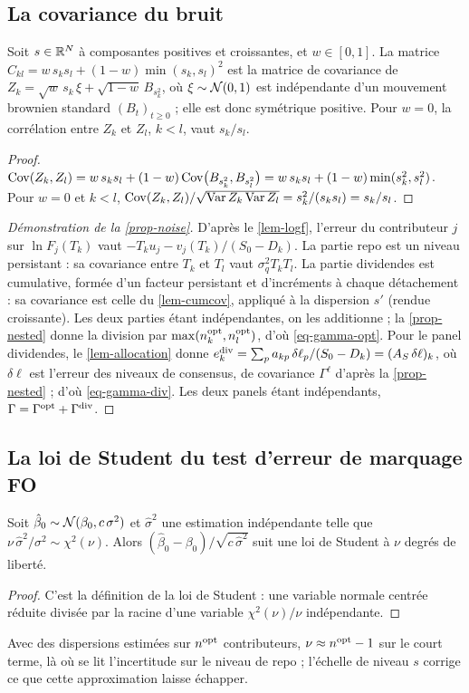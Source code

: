\subsection{La covariance du bruit}\label{app-noise}
\begin{lemma}\label{lem-cumcov}
Soit $s\in\mathbb{R}^N$ à composantes positives et croissantes, et $w\in[0,1]$. La matrice
$C_{kl}=w\,s_ks_l+(1-w)\min(s_k, s_l)^2$ est la matrice de covariance de $Z_k=\sqrt{w}\,s_k\,\xi+\sqrt{1-w}\,B_{s_k^2}$,
où $\xi\sim\mathcal{N}(0,1)$ est indépendante d'un mouvement brownien standard $(B_t)_{t\ge0}$ ; elle est donc symétrique
positive. Pour $w=0$, la corrélation entre $Z_k$ et $Z_l$, $k<l$, vaut $s_k/s_l$.
\end{lemma}
\begin{proof}
$\operatorname{Cov}(Z_k, Z_l)=w\,s_ks_l+(1-w)\operatorname{Cov}\bigl(B_{s_k^2}, B_{s_l^2}\bigr)=w\,s_ks_l+(1-w)\min(s_k^2, s_l^2)$. Pour $w=0$ et $k<l$,
$\operatorname{Cov}(Z_k, Z_l)/\sqrt{\operatorname{Var} Z_k\operatorname{Var} Z_l}=s_k^2/(s_ks_l)=s_k/s_l$.
\end{proof}

\begin{proof}[Démonstration de la \cref{prop-noise}]
D'après le \cref{lem-logf}, l'erreur du contributeur $j$ sur $\ln F_j(T_k)$ vaut $-T_ku_j-v_j(T_k)/(S_0-D_k)$. La partie
repo est un niveau persistant : sa covariance entre $T_k$ et $T_l$ vaut $\sigma_q^2T_kT_l$. La partie dividendes est
cumulative, formée d'un facteur persistant et d'incréments à chaque détachement : sa covariance est celle du
\cref{lem-cumcov}, appliqué à la dispersion $s'$ (rendue croissante). Les deux parties étant indépendantes, on les
additionne ; la \cref{prop-nested} donne la division par $\max(n^{\mathrm{opt}}_k, n^{\mathrm{opt}}_l)$, d'où \eqref{eq-gamma-opt}.
Pour le panel dividendes, le \cref{lem-allocation} donne
$e^{\mathrm{div}}_k=\sum_pa_{kp}\,\delta\ell_p/(S_0-D_k)=(A_S\,\delta\ell)_k$, où $\delta\ell$ est l'erreur des niveaux de
consensus, de covariance $\Gamma^\ell$ d'après la \cref{prop-nested} ; d'où \eqref{eq-gamma-div}. Les deux panels étant
indépendants, $\Gamma=\Gamma^{\mathrm{opt}}+\Gamma^{\mathrm{div}}$.
\end{proof}

\subsection{La loi de Student du test d'erreur de marquage FO}\label{app-student}
\begin{lemma}
Soit $\hat\beta_0\sim\mathcal{N}(\beta_0, c\,\sigma^2)$ et $\hat\sigma^2$ une estimation indépendante telle que
$\nu\,\hat\sigma^2/\sigma^2\sim\chi^2(\nu)$. Alors $(\hat\beta_0-\beta_0)/\sqrt{c\,\hat\sigma^2}$ suit une loi de Student à
$\nu$ degrés de liberté.
\end{lemma}
\begin{proof}
C'est la définition de la loi de Student : une variable normale centrée réduite divisée par la racine d'une variable
$\chi^2(\nu)/\nu$ indépendante.
\end{proof}
Avec des dispersions estimées sur $n^{\mathrm{opt}}$ contributeurs, $\nu\approx n^{\mathrm{opt}}-1$ sur le court terme, là où se lit
l'incertitude sur le niveau de repo ; l'échelle de niveau $s$ corrige ce que cette approximation laisse échapper.

